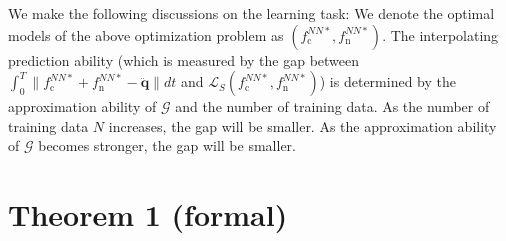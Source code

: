 \documentclass[aps,pre,reprint,superscriptaddress,nofootinbib,amsmath,amssymb]{revtex4-2}
\newcommand{\mat}[1]{\mathbf{#1}}
\newcommand{\qdd}{\ddot{\mat{q}}}
\begin{document}
We make the following discussions on the learning task:
We denote the optimal models of the above optimization problem as $(f_{\mathrm{c}}^{NN*}, f_{\mathrm{n}}^{NN*})$. The interpolating prediction ability (which is measured by the gap between $\int_{0}^T\|f_{\mathrm{c}}^{NN*}+f_{\mathrm{n}}^{NN*}-\qdd\|dt$ and $\mathcal{L}_S(f_{\mathrm{c}}^{NN*},f_{\mathrm{n}}^{NN*})$) is determined by the approximation ability of $\mathcal{G}$ and the number of training data. As the number of training data $N$ increases, the gap will be smaller. As the approximation ability of $\mathcal{G}$ becomes stronger, the gap will be smaller.


\section{Theorem 1 (formal)}\label{sec:Theorem1_formal}
\end{document}
